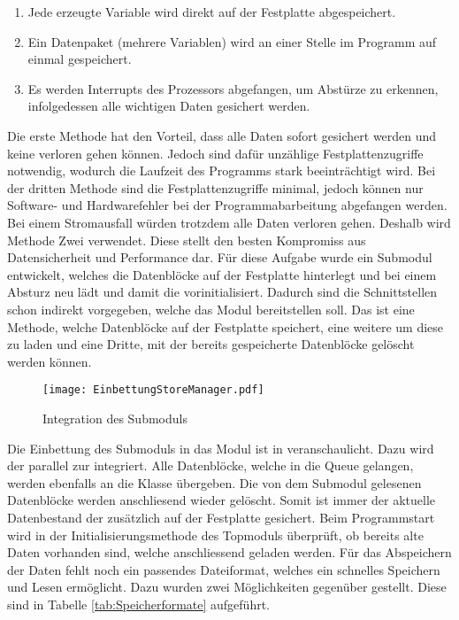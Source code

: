 \begin{enumerate}
\item Jede erzeugte Variable wird direkt auf der Festplatte abgespeichert.
\item Ein Datenpaket (mehrere Variablen) wird an einer Stelle im Programm auf
einmal gespeichert.
\item Es werden Interrupts des Prozessors abgefangen, um Abst{\"u}rze zu erkennen,
infolgedessen alle wichtigen Daten gesichert werden.
\end{enumerate}

Die erste Methode hat den Vorteil, dass alle Daten sofort gesichert werden und
keine verloren gehen k{\"o}nnen. Jedoch sind daf{\"u}r unz{\"a}hlige Festplattenzugriffe
notwendig, wodurch die Laufzeit des Programms stark beeintr{\"a}chtigt wird. Bei der
dritten Methode sind die Festplattenzugriffe minimal, jedoch k{\"o}nnen nur
Software- und Hardwarefehler bei der Programmabarbeitung abgefangen werden. Bei
einem Stromausfall w{\"u}rden trotzdem alle Daten verloren gehen. Deshalb wird
Methode Zwei verwendet. Diese stellt den besten Kompromiss aus Datensicherheit
und Performance dar. \newline
F{\"u}r diese Aufgabe wurde ein Submodul entwickelt, welches die Datenbl{\"o}cke auf
der Festplatte hinterlegt und bei einem Absturz neu l{\"a}dt und damit die
 vorinitialisiert. Dadurch sind die Schnittstellen schon indirekt
vorgegeben, welche das Modul bereitstellen soll. Das ist eine Methode,
welche Datenbl{\"o}cke auf der Festplatte speichert, eine weitere um diese zu laden
und eine Dritte, mit der bereits gespeicherte Datenbl{\"o}cke gel{\"o}scht werden
k{\"o}nnen.

\begin{figure}[H]
\centering
\texttt{[image: EinbettungStoreManager.pdf]}
\caption{Integration des Submoduls }
\label{fig:EinbettungStoreManager}
\end{figure}

Die Einbettung des Submoduls  in das Modul  ist
in  veranschaulicht. Dazu wird der
 parallel zur  integriert. Alle
Datenbl{\"o}cke, welche in die Queue gelangen, werden ebenfalls an die
Klasse  {\"u}bergeben. Die von dem Submodul 
gelesenen Datenbl{\"o}cke werden anschliesend wieder gel{\"o}scht. Somit ist immer der
aktuelle Datenbestand der 
zus{\"a}tzlich auf der Festplatte gesichert. Beim Programmstart wird in der
Initialisierungsmethode des Topmoduls {\"u}berpr{\"u}ft, ob bereits alte Daten vorhanden
sind, welche anschliessend geladen werden. \newline
F{\"u}r das Abspeichern der
Daten fehlt noch ein passendes Dateiformat, welches ein schnelles Speichern und
Lesen erm{\"o}glicht. Dazu wurden zwei M{\"o}glichkeiten gegen{\"u}ber gestellt. Diese sind
in Tabelle \ref{tab:Speicherformate} aufgef{\"u}hrt.

